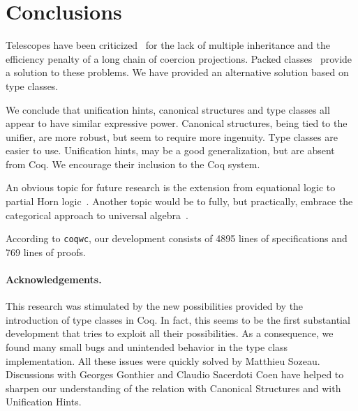 \documentclass[a4paper,10pt,runningheads]{llncs}
\begin{document}
\section{Conclusions}
Telescopes have been criticized~\cite{Packed} for the lack of multiple inheritance and
the efficiency penalty of a long chain of coercion projections. Packed classes~\cite{Packed} provide
a solution to these problems. We have provided an alternative solution based on type classes. 

We conclude that unification hints, canonical structures and type classes all appear to have
similar expressive power. Canonical structures, being tied to the unifier, are more robust, but
seem to require more ingenuity. Type classes are easier to use. Unification hints, may be a
good generalization, but are absent from Coq. We encourage their inclusion to the
Coq system.

An obvious topic for future research is the extension from equational logic to partial Horn
logic~\cite{palmgren2007partial}. Another topic would be to fully, but practically, embrace the
categorical approach to universal algebra~\cite{pitts2001categorical}.

According to \lstinline|coqwc|, our development consists of 4895 lines of
specifications and 769 lines of proofs.


% 

\paragraph{Acknowledgements.}
This research was stimulated by the new possibilities provided by the introduction of type classes
in Coq. In fact, this seems to be the first substantial development that tries to exploit all their
possibilities. As a consequence, we found many small bugs and unintended behavior in the type
class implementation. All these issues were quickly solved by Matthieu Sozeau. Discussions with
Georges Gonthier and Claudio Sacerdoti Coen have helped to
sharpen our understanding of the relation with Canonical Structures and with Unification Hints.


\end{document}
